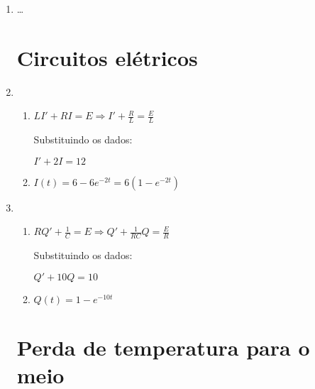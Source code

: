 \documentclass[a4paper]{article}
\begin{document}
\begin{enumerate}


\item \ldots



\section{Circuitos elétricos}

\item 


  \begin{enumerate}
  \item  $LI' + RI = E \Rightarrow I' + \frac{R}{L} = \frac{E}{L}$

    Substituindo os dados:

    $I' +2I = 12$

  \item $I(t) = 6-6e^{-2t} = 6(1-e^{-2t})$ 
  \end{enumerate}
  

\item 

  \begin{enumerate}
  \item $RQ' + \frac{1}{C} = E \Rightarrow Q' + \frac{1}{RC}Q = \frac{E}{R}$

    Substituindo os dados:

    $Q' +10Q = 10$

  \item $Q(t) = 1-e^{-10t}$
  \end{enumerate}

  \section{Perda de temperatura para o meio}


\end{enumerate}
\end{document}
